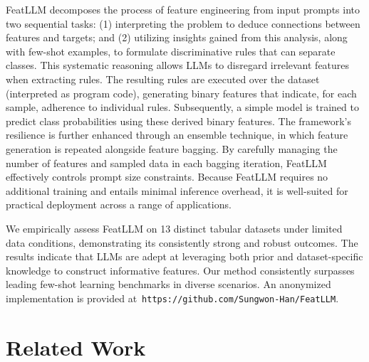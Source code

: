 \textsf{FeatLLM} decomposes the process of feature engineering from input prompts into two sequential tasks: (1) interpreting the problem to deduce connections between features and targets; and (2) utilizing insights gained from this analysis, along with few-shot examples, to formulate discriminative rules that can separate classes. This systematic reasoning allows LLMs to disregard irrelevant features when extracting rules. The resulting rules are executed over the dataset (interpreted as program code), generating binary features that indicate, for each sample, adherence to individual rules. Subsequently, a simple model is trained to predict class probabilities using these derived binary features. The framework’s resilience is further enhanced through an ensemble technique, in which feature generation is repeated alongside feature bagging. By carefully managing the number of features and sampled data in each bagging iteration, \textsf{FeatLLM} effectively controls prompt size constraints. Because \textsf{FeatLLM} requires no additional training and entails minimal inference overhead, it is well-suited for practical deployment across a range of applications.

We empirically assess \textsf{FeatLLM} on 13 distinct tabular datasets under limited data conditions, demonstrating its consistently strong and robust outcomes. The results indicate that LLMs are adept at leveraging both prior and dataset-specific knowledge to construct informative features. Our method consistently surpasses leading few-shot learning benchmarks in diverse scenarios. An anonymized implementation is provided at~\texttt{https://github.com/Sungwon-Han/FeatLLM}.

\section{Related Work}

